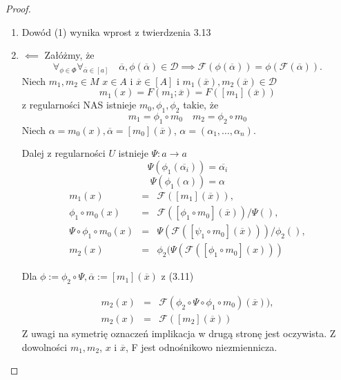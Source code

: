 \documentclass[12pt,a4paper]{report}
\newcommand{\domkniecie}[1]{\left\lbrack{#1}\right\rbrack}
\begin{document}
\begin{proof} 
\begin{enumerate}
\item
Dowód (1) wynika wprost z twierdzenia 3.13
\item
$\impliedby$
Załóżmy, że 
\begin{equation}
\forall_{\phi \in \Phi} \forall_{\overline{\alpha} \in \domkniecie{a}} \quad \overline{\alpha}, \phi(\overline{\alpha}) \in \mathcal{D} \implies \mathcal{F}(\phi(\overline{\alpha}))=\phi(\mathcal{F}(\overline{\alpha})).
\end{equation}
Niech $m_1, m_2 \in M$ $x \in A$ i $\overline{x} \in \domkniecie{A}$ i $m_1(\overline{x}), m_2(\overline{x}) \in \mathcal{D}$
$$
m_1(x)=F(m_1;\overline{x})=F(\domkniecie{m_1}(\overline{x}))
$$
 z regularności NAS istnieje $m_0, \phi_1 , \phi_2$ takie, że 
$$ 
m_1=\phi_1\circ m_0 \quad m_2=\phi_2\circ m_0
$$
Niech $\alpha=m_0(x), \overline{\alpha}=\domkniecie{m_0}(\overline{x})$, $\alpha=(\alpha_1,\dots,\alpha_n)$.

Dalej z regularności $U$ istnieje $\Psi:a \to a$
$$
 \Psi(\phi_1(\overline{\alpha_i}))=\overline{\alpha_i}
$$
$$
 \Psi(\phi_1(\alpha))=\alpha
$$
\begin{eqnarray*}
m_1(x) & = & \mathcal{F}(\domkniecie{m_1}(\overline{x})),\\ 
\phi_1 \circ m_0(x)& = & \mathcal{F}(\domkniecie{\phi_1 \circ m_0}(\overline{x}))/\Psi(),\\ 
\Psi \circ \phi_1 \circ m_0(x)&= & \Psi(\mathcal{F}(\domkniecie{\psi_1 \circ m_0}(\overline{x})))/\phi_2(),\\
m_2(x)&=&\phi_2(\Psi(\mathcal{F}(\domkniecie{\phi_1 \circ m_0}(x)))
\end{eqnarray*}

Dla $\phi:=\phi_2\circ \Psi, \overline{\alpha}:=\domkniecie{m_1}(\overline{x})$ z (3.11)

\begin{eqnarray*}
m_2(x) & = & \mathcal{F}(\phi_2 \circ \Psi \circ \phi_1 \circ m_0)(\overline{x})),\\
m_2(x) & = & \mathcal{F}(\domkniecie{m_2}(\overline{x}))
\end{eqnarray*}
Z uwagi na symetrię oznaczeń implikacja w drugą stronę jest oczywista. Z dowolności $m_1, m_2$, $x$ i $\overline{x}$, F jest odnośnikowo niezmiennicza.


\end{enumerate}
\end{proof}
\end{document}
